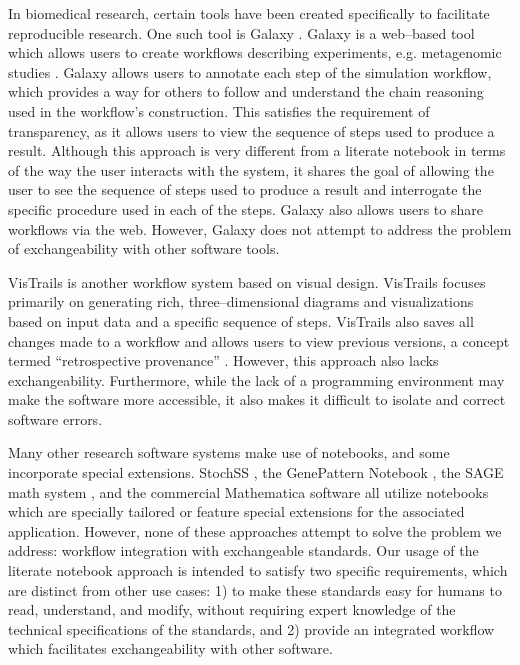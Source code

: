 \documentclass[10pt,letterpaper]{article}
\begin{document}
In biomedical research, certain tools have been created specifically to facilitate reproducible research. One such tool is Galaxy \cite{goecks2010galaxy}. Galaxy is a web--based tool which allows users to create workflows describing experiments, e.g. metagenomic studies \cite{pond2009windshield}. Galaxy allows users to annotate each step of the simulation workflow, which provides a way for others to follow and understand the chain reasoning used in the workflow's construction. This satisfies the requirement of transparency, as it allows users to view the sequence of steps used to produce a result. Although this approach is very different from a literate notebook in terms of the way the user interacts with the system, it shares the goal of allowing the user to see the sequence of steps used to produce a result and interrogate the specific procedure used in each of the steps. Galaxy also allows users to share workflows via the web. However, Galaxy does not attempt to address the problem of exchangeability with other software tools.

VisTrails \cite{callahan2006vistrails} is another workflow system based on visual design. VisTrails focuses primarily on generating rich, three--dimensional diagrams and visualizations based on input data and a specific sequence of steps. VisTrails also saves all changes made to a workflow and allows users to view previous versions, a concept termed ``retrospective provenance'' \cite{piccolo2016tools}.
However, this approach also lacks exchangeability. Furthermore, while the lack of a programming environment may make the software more accessible, it also makes it difficult to isolate and correct software errors.

Many other research software systems make use of notebooks, and some incorporate special extensions. StochSS \cite{drawert2016stochastic}, the GenePattern Notebook \cite{reich2017genepattern}, the SAGE math system \cite{erocal2010sage}, and the commercial Mathematica software \cite{wolfram1996mathematica} all utilize notebooks which are specially tailored or feature special extensions for the associated application. However, none of these approaches attempt to solve the problem we address: workflow integration with exchangeable standards. Our usage of the literate notebook approach is intended to satisfy two specific requirements, which are distinct from other use cases: 1) to make these standards easy for humans to read, understand, and modify, without requiring expert knowledge of the technical specifications of the standards, and 2) provide an integrated workflow which facilitates exchangeability with other software.
\end{document}
